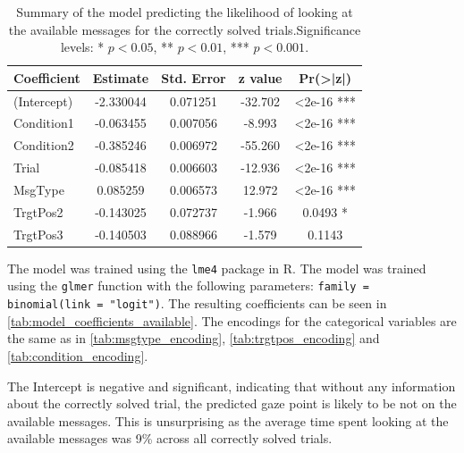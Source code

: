 \begin{table}[h!]
\centering
\begin{tabular}{|l|c|c|c|c|}
\hline
\textbf{Coefficient} & \textbf{Estimate} & \textbf{Std. Error} & \textbf{z value} & \textbf{Pr(>|z|)} \\ \hline
(Intercept)          & -2.330044         & 0.071251            & -32.702          & <2e-16 ***        \\ \hline
Condition1           & -0.063455         & 0.007056            & -8.993           & <2e-16 ***        \\ \hline
Condition2           & -0.385246         & 0.006972            & -55.260          & <2e-16 ***        \\ \hline
Trial                & -0.085418         & 0.006603            & -12.936          & <2e-16 ***        \\ \hline
MsgType             & 0.085259          & 0.006573            & 12.972           & <2e-16 ***        \\ \hline
TrgtPos2             & -0.143025         & 0.072737            & -1.966           & 0.0493 *          \\ \hline
TrgtPos3             & -0.140503         & 0.088966            & -1.579           & 0.1143            \\ \hline
\end{tabular}
\caption{Summary of the model predicting the likelihood of looking at the available messages for the correctly solved trials.Significance levels: * $p < 0.05$, ** $p < 0.01$, *** $p < 0.001$.}
\label{tab:model_coefficients_available}
\end{table}

The model was trained using the \texttt{lme4} package in R. The model was trained using the \texttt{glmer} function with the following parameters: \texttt{family = binomial(link = "logit")}. The resulting coefficients can be seen in \autoref{tab:model_coefficients_available}. The encodings for the categorical variables are the same as in \autoref{tab:msgtype_encoding}, \autoref{tab:trgtpos_encoding} and \autoref{tab:condition_encoding}.

The Intercept is negative and significant, indicating that without any information about the correctly solved trial, the predicted gaze point is likely to be not on the available messages. This is unsurprising as the average time spent looking at the available messages was 9\% across all correctly solved trials. 

